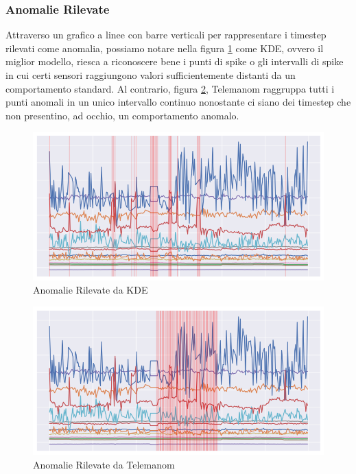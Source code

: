 \subsubsection{Anomalie Rilevate}
Attraverso un grafico a linee con barre verticali per rappresentare i timestep rilevati come anomalia, possiamo notare nella figura \ref{kde} come KDE, ovvero il miglior modello, riesca a riconoscere bene i punti di spike o gli intervalli di spike in cui certi sensori raggiungono valori sufficientemente distanti da un comportamento standard. Al contrario, figura \ref{worst_clf}, Telemanom raggruppa tutti i punti anomali in un unico intervallo continuo nonostante ci siano dei timestep che non presentino, ad occhio, un comportamento anomalo.

\begin{figure}[t]
	\centering
	\includegraphics[width=14cm, scale=1]{images/kde}
    \caption{Anomalie Rilevate da KDE}
	\label{kde}

\end{figure}

\begin{figure}[t]
	\centering
	\includegraphics[width=14cm, scale=1]{images/worst_clf}
  \caption{Anomalie Rilevate da Telemanom}
	\label{worst_clf}

\end{figure}


